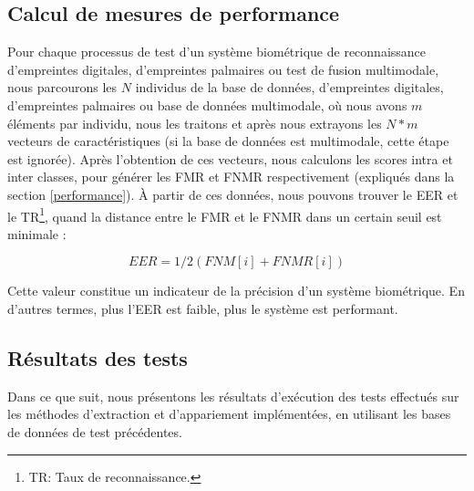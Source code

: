 \subsection{Calcul de mesures de performance}
Pour chaque processus de test d’un système biométrique de reconnaissance d’empreintes digitales, d’empreintes palmaires ou test de fusion multimodale, nous parcourons les $ N $ individus de la base de données, d’empreintes digitales, d’empreintes palmaires ou base de données multimodale, où nous avons $ m $ éléments par individu, nous les traitons et après nous extrayons les $ N*m $ vecteurs de caractéristiques (si la base de données est multimodale, cette étape est ignorée). Après l'obtention de ces vecteurs, nous calculons les scores intra et inter classes, pour générer les FMR et FNMR respectivement (expliqués dans la section \ref{performance}). À partir de ces données, nous pouvons trouver le EER et le TR\footnote{TR: Taux de reconnaissance.}, quand la distance entre le FMR et le FNMR dans un certain seuil est minimale :
\begin{center}
	\begin{equation}\label{EER}
	EER=1/2(FNM[i]+FNMR[i])
	\end{equation}
\end{center}
Cette valeur constitue un indicateur de la précision d’un système biométrique. En d’autres termes, plus l’EER est faible, plus le système est performant. 
\subsection{Résultats des tests}
Dans ce que suit, nous présentons les résultats d’exécution des tests effectués sur les méthodes d’extraction et d’appariement implémentées, en utilisant les bases de données de test précédentes.
